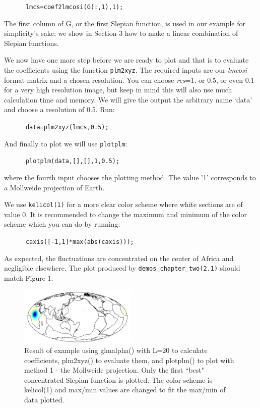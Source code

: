 \documentclass[11pt]{article}
\begin{document}
\verb+		lmcs=coef2lmcosi(G(:,1),1);+

The first column of G, or the first Slepian function, is used in our example for simplicity's sake; we show in Section 3 how to make a linear combination of Slepian functions.

We now have one more step before we are ready to plot and that is to evaluate the coefficients using the function \verb+plm2xyz+. The required inputs are our \textit{lmcosi} format matrix and a chosen resolution. You can choose \textit{res}=1, or 0.5, or even 0.1 for a very high resolution image, but keep in mind this will also use much calculation time and memory.  We will give the output the arbitrary name `data' and choose  a resolution of 0.5. Run:

\verb+		data=plm2xyz(lmcs,0.5);+

And finally to plot we will use \verb+plotplm+:

\verb+		plotplm(data,[],[],1,0.5);+

where the fourth input chooses the plotting method. The value '1' corresponds to a Mollweide projection of Earth.

We use \verb+kelicol(1)+ for a more clear color scheme where white sections are of value 0. It is recommended to change the maximum and minimum of the color scheme which you can do by running:

\verb+		caxis([-1,1]*max(abs(caxis)));+

As expected, the fluctuations are concentrated on the center of Africa and negligible elsewhere. The plot produced by \verb|demos_chapter_two(2.1)| should match Figure 1.

\begin{figure}[H]
  \centering
  \includegraphics[width=0.5\textwidth]{figures/figure1.png}
  \caption{Result of example using glmalpha() with L=20 to calculate coefficients, plm2xyz() to evaluate them, and plotplm() to plot with method 1 - the Mollweide projection. Only the first ``best" concentrated Slepian function is plotted. The color scheme is kelicol(1) and max/min values are changed to fit the max/min of data plotted.}
\label{figure1}
\end{figure}
\end{document}
